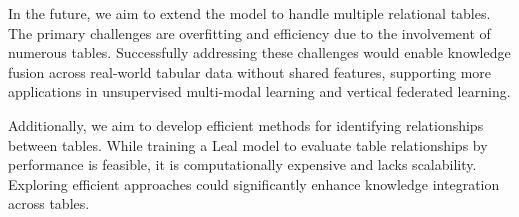 In the future, we aim to extend the model to handle multiple relational tables. The primary challenges are overfitting and efficiency due to the involvement of numerous tables. Successfully addressing these challenges would enable knowledge fusion across real-world tabular data without shared features, supporting more applications in unsupervised multi-modal learning and vertical federated learning.

Additionally, we aim to develop efficient methods for identifying relationships between tables. While training a Leal model to evaluate table relationships by performance is feasible, it is computationally expensive and lacks scalability. Exploring efficient approaches could significantly enhance knowledge integration across tables.
